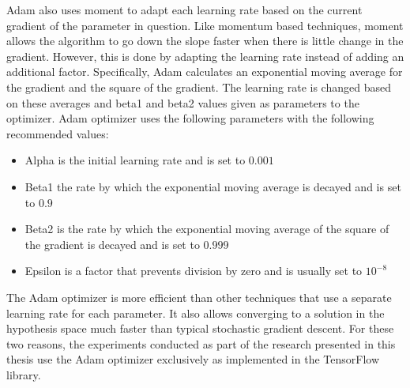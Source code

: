 Adam also uses moment to adapt each learning rate based on the current gradient of the parameter in question. Like momentum based techniques, moment allows the algorithm to go down the slope faster when there is little change in the gradient. However, this is done by adapting the learning rate instead of adding an additional factor. Specifically, Adam calculates an exponential moving average for the gradient and the square of the gradient. The learning rate is changed based on these averages and beta1 and beta2 values given as parameters to the optimizer\cite{DBLP:journals/corr/KingmaB14}.  Adam optimizer uses the following parameters with the following recommended values:
\begin{itemize}
	\item Alpha is the initial learning rate and is set to $0.001$
	\item Beta1 the rate by which the exponential moving average is decayed and is set to $0.9$
	\item Beta2 is the rate by which the exponential moving average  of the square of the gradient is decayed and is set to $0.999$
	\item Epsilon is a factor that prevents division by zero  and is usually set to $10^{-8}$
\end{itemize}	

The Adam optimizer is more efficient than other techniques that use a separate learning rate for each parameter. It also allows converging to a solution in the hypothesis space much faster than typical stochastic gradient descent\cite{DBLP:journals/corr/KingmaB14}. For these two reasons, the experiments conducted as part of the research presented in this thesis use the Adam optimizer exclusively as implemented in the TensorFlow library.
